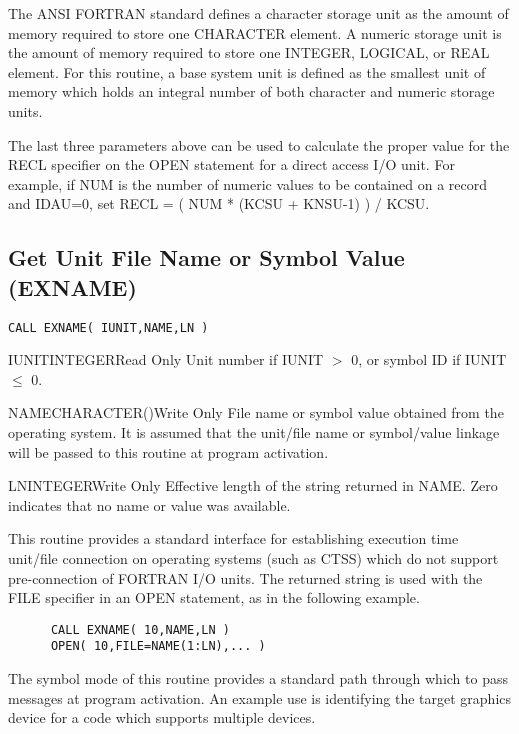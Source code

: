 The ANSI FORTRAN standard defines a character storage unit as the amount of
memory required to store one CHARACTER element.  A numeric storage unit is
the amount of memory required to store one INTEGER, LOGICAL, or REAL
element.  For this routine, a base system unit is defined as the smallest
unit of memory which holds an integral number of both character and numeric
storage units.

The last three parameters above can be used to calculate the proper value
for the RECL specifier on the OPEN statement for a direct access I/O unit.
For example, if NUM is the number of numeric values to be contained on a
record and IDAU=0, set RECL = ( NUM * (KCSU + KNSU-1) ) / KCSU.


\subsection{Get Unit File Name or Symbol Value (EXNAME)}

\verb+CALL EXNAME( IUNIT,NAME,LN )+

\begin{argy}{IUNIT}{INTEGER}{Read Only}
Unit number if IUNIT $>$ 0, or symbol ID if IUNIT $\leq$ 0.
\end{argy}

\begin{argy}{NAME}{CHARACTER\last(\last)}{Write Only}
File name or symbol value obtained from the operating system. It is assumed
that the unit/file name or symbol/value linkage will be passed to this
routine at program activation.
\end{argy}

\begin{argy}{LN}{INTEGER}{Write Only}
Effective length of the string returned in NAME.  Zero indicates that no
name or value was available.
\end{argy}

This routine provides a standard interface for establishing execution time
unit/file connection on operating systems (such as CTSS) which do not
support pre-connection of FORTRAN I/O units.  The returned string is used
with the FILE specifier in an OPEN statement, as in the following example.
\begin{verbatim}
      CALL EXNAME( 10,NAME,LN )
      OPEN( 10,FILE=NAME(1:LN),... )
\end{verbatim}
The symbol mode of this routine provides a standard path through which to
pass messages at program activation.  An example use is identifying the
target graphics device for a code which supports multiple devices.

